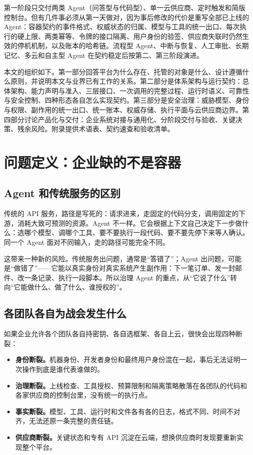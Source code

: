 第一阶段只交付两类 Agent（问答型与代码型）、单一云供应商、定时触发和简版控制台。但有几件事必须从第一天做对，因为事后修改的代价是重写全部已上线的 Agent：容器契约的事件格式、权威状态的归属、模型与工具的统一出口、每次执行的硬上限、两类幂等、令牌的接口隔离、用户身份的验签、供应商失联时仍然生效的停机机制，以及账本的哈希链。流程型 Agent、中断与恢复、人工审批、长期记忆、多云和自主型 Agent 在契约稳定后按第二、第三阶段演进。

本文的组织如下。第一部分回答平台为什么存在、托管的对象是什么、设计遵循什么原则，并说明本文与业界已有工作的关系。第二部分是体系架构与运行契约：总体架构、能力声明与准入、三层接口、一次调用的完整过程、运行时语义、可靠性与安全控制、四种形态各自怎么实现契约。第三部分是安全治理：威胁模型、身份与权限、副作用的统一出口、统一账本、权威存储、执行平面与云供应商边界。第四部分讨论产品化与交付：企业系统对接与通用化、分阶段交付与验收、关键决策、残余风险。附录提供术语表、契约速查和验收清单。

\section{问题定义：企业缺的不是容器}
\label{sec:problem}

\subsection{Agent 和传统服务的区别}

传统的 API 服务，路径是写死的：请求进来，走固定的代码分支，调用固定的下游，消耗大致可预测的资源。Agent 不一样。它会根据上下文自己决定下一步做什么：选哪个模型、调哪个工具、要不要执行一段代码、要不要先停下来等人确认。同一个 Agent 面对不同输入，走的路径可能完全不同。

这带来一种新的风险。传统服务出问题，通常是“答错了”；Agent 出问题，可能是“做错了”——它能以真实身份对真实系统产生副作用：下一笔订单、发一封邮件、改一条记录、执行一段脚本。所以治理 Agent 的重点，从“它说了什么”转向“它能做什么、做了什么、谁授权的”。

\subsection{各团队各自为战会发生什么}

如果企业允许各个团队各自持密钥、各自选框架、各自上云，很快会出现四种断裂：

\begin{itemize}
  \item \textbf{身份断裂。}机器身份、开发者身份和最终用户身份混在一起，事后无法证明一次操作到底是谁代表谁做的。
  \item \textbf{治理断裂。}上线检查、工具授权、预算限制和隔离策略散落在各团队的代码和各家供应商的控制台里，没有统一的执行点。
  \item \textbf{事实断裂。}模型、工具、运行时和文件各有各的日志，格式不同、时间不对齐，无法还原一条完整的责任链。
  \item \textbf{供应商断裂。}关键状态和专有 API 沉淀在云端，想换供应商时发现要重新实现整个平台。
\end{itemize}

